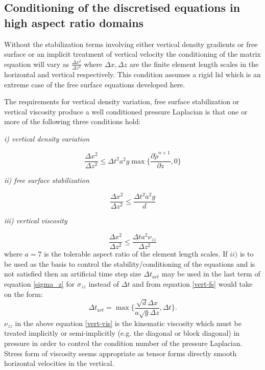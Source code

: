 \subsection{Conditioning of the discretised equations in
high aspect ratio domains}
\noindent
Without the stabilization terms involving either
vertical density gradients or free surface or an implicit treatment
of vertical velocity the conditioning of the matrix equation
will vary as $\frac{\Delta x^2}{\Delta z^2}$ where
${\Delta x}, {\Delta z}$ are the finite element length scales
in the horizontal and vertical respectively. This condition
assumes a rigid lid which is an extreme case of the free surface equations
developed here.

The requirements for vertical density variation, free surface stabilization
or vertical viscosity produce a well conditioned
pressure Laplacian is that one or more of the following three
conditions hold:


\noindent
{\it i) vertical density variation}

\begin{equation}
\frac{\Delta x^2}{\Delta z^2} \leq \Delta t^2 a^2 g
\max\{\frac{\partial \tilde \rho^{n+1}}{\partial z}, 0\}
\label{vert-den}
\end{equation}

\noindent
{\it ii) free surface stabilization}

\begin{equation}
\frac{\Delta x^2}{\Delta z^2} \leq \frac{ \Delta t^2 a^2 g }{d}
\label{vert-fs}
\end{equation}

\noindent
{\it iii) vertical viscosity}

\begin{equation}
\frac{\Delta x^2}{\Delta z^2} \leq \frac{ \Delta t a^2 \nu_{zz} }{\Delta z^2}
\label{vert-vis}
\end{equation}
where $a=7$ is the tolerable aspect ratio of the element length scales.
If $ii)$ is to be used as the basis to control the stability/conditioning
of the equations and is not satisfied then an artificial time step size $\Delta t_{art}$
may be used in the last term of
equation \ref{sigma_z} for $\sigma_{zz}$ instead of $\Delta t$ and from
equation \ref{vert-fs} would take on the form:
\begin{equation}
\Delta t_{art} = \max\{ \frac{\sqrt{d}\Delta x}{a \sqrt{g} \Delta z}, \Delta t \}.
\label{vert-fs-art}
\end{equation}
$\nu_{zz}$ in the above equation \ref{vert-vis} is the kinematic viscosity which must be treated implicitly
or semi-implicitly (e.g. the diagonal or block diagonal)
in pressure in order to control the condition
number of the pressure Laplacian. Stress form of viscosity seems
appropriate as tensor forms directly smooth horizontal velocities
in the vertical.

